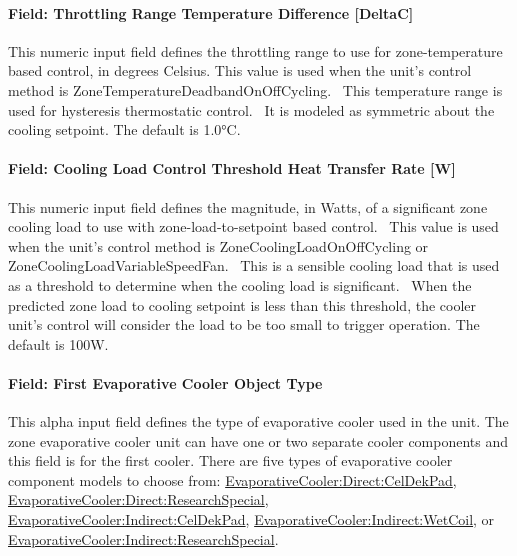 \paragraph{Field: Throttling Range Temperature Difference {[}DeltaC{]}}\label{field-throttling-range-temperature-difference-deltac}

This numeric input field defines the throttling range to use for zone-temperature based control, in degrees Celsius. This value is used when the unit's control method is ZoneTemperatureDeadbandOnOffCycling.~ This temperature range is used for hysteresis thermostatic control.~ It is modeled as symmetric about the cooling setpoint. The default is 1.0\si{\degreeCelsius}.

\paragraph{Field: Cooling Load Control Threshold Heat Transfer Rate {[}W{]}}\label{field-cooling-load-control-threshold-heat-transfer-rate-w}

This numeric input field defines the magnitude, in Watts, of a significant zone cooling load to use with zone-load-to-setpoint based control.~ This value is used when the unit's control method is ZoneCoolingLoadOnOffCycling or ZoneCoolingLoadVariableSpeedFan.~ This is a sensible cooling load that is used as a threshold to determine when the cooling load is significant.~ When the predicted zone load to cooling setpoint is less than this threshold, the cooler unit's control will consider the load to be too small to trigger operation. The default is 100W.

\paragraph{Field: First Evaporative Cooler Object Type}\label{field-first-evaporative-cooler-object-type}

This alpha input field defines the type of evaporative cooler used in the unit. The zone evaporative cooler unit can have one or two separate cooler components and this field is for the first cooler. There are five types of evaporative cooler component models to choose from: \hyperref[evaporativecoolerdirectceldekpad]{EvaporativeCooler:Direct:CelDekPad}, \hyperref[evaporativecoolerdirectresearchspecial]{EvaporativeCooler:Direct:ResearchSpecial}, \hyperref[evaporativecoolerindirectceldekpad]{EvaporativeCooler:Indirect:CelDekPad}, \hyperref[evaporativecoolerindirectwetcoil]{EvaporativeCooler:Indirect:WetCoil}, or \hyperref[evaporativecoolerindirectresearchspecial]{EvaporativeCooler:Indirect:ResearchSpecial}.

